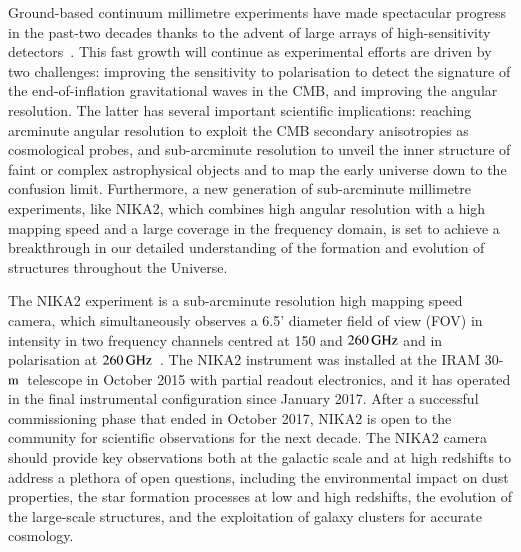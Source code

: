 \documentclass[traditionalabstract]{aa}
\newcommand{\trentemetre}{30-$\rm{m}$}
\newcommand{\lp}[1]{#1}
\newcommand{\rev}[1]{#1}
\newcommand{\LEt}[1]{{\bf {\color[RGB]{0, 153, 255} #1}}}
\begin{document}
Ground-based {\lp continuum} millimetre experiments have made spectacular progress in
the past-two decades thanks to the advent of large arrays of
high-sensitivity detectors~\citep{Wilson2008_AZTEC,
  Siringo2009_LABOCA, Staguhn2011_GISMO, Swetz2011_ACT, Monfardini2011_NIKA, Polarbear_2012, Bleem2012_SPT, Holland2013_SCUBA2,
  Dicker2014_MUSTANG2, BKS_2015, Adam2017, BICEP3_2018}. 
This fast growth will continue as experimental efforts are
driven by two challenges: improving the sensitivity to
polarisation to detect the signature of
the end-of-inflation gravitational waves in the CMB, and {\rev
improving the angular resolution. The latter has several important
scientific implications: reaching arcminute angular resolution to
exploit the CMB secondary anisotropies as cosmological probes, and
sub-arcminute resolution to unveil the inner structure of faint or
complex astrophysical objects and to map the early universe down to
the confusion limit.}
Furthermore, a new
generation of sub-arcminute millimetre experiments, like NIKA2, which
combines high angular resolution with a high mapping speed and a large
coverage in the frequency domain, is set to achieve a breakthrough in 
our detailed understanding of the formation and evolution of
structures throughout the Universe.


The NIKA2 experiment is a sub-arcminute resolution
high mapping speed camera, which simultaneously observes a 6.5' diameter
field of view (FOV) in intensity in two
frequency channels centred at 150 and $260\,\rm{GHz}$ and in
polarisation at $260\, \rm{GHz}$~\citep{Adam2018}. The %
NIKA2 instrument was installed at the IRAM \trentemetre\ telescope in October 2015 with partial readout
electronics, and it has operated in the final instrumental configuration since
January 2017. After a successful
commissioning phase that ended in October 2017, NIKA2 is
open to the community for scientific observations for the next
decade. The NIKA2 camera should provide key observations both at the galactic scale
and at high redshifts to address a plethora of open questions, including
the environmental impact on dust properties, the star formation processes
at low and high redshifts, the evolution of the large-scale structures,
and the exploitation of galaxy clusters for accurate cosmology.
%
\end{document}
